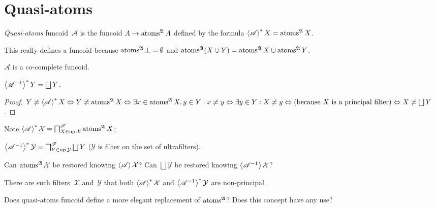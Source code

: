 \chapter{Quasi-atoms}

\begin{defn}
\emph{Quasi-atoms} funcoid~$\mathscr{A}$ is the funcoid $A\rightarrow \operatorname{atoms}^{\mathfrak{A}} A$ defined by the formula
$\left\langle \mathscr{A}\right\rangle ^{\ast} X = \operatorname{atoms}^{\mathfrak{A}} X$.
\end{defn}

This really defines a funcoid because $\operatorname{atoms}^{\mathfrak{A}} \bot = \emptyset$ and
$\operatorname{atoms}^{\mathfrak{A}}(X\cup Y) = \operatorname{atoms}^{\mathfrak{A}}X\cup\operatorname{atoms}^{\mathfrak{A}}Y$.

\begin{obvious}
$\mathscr{A}$ is a co-complete funcoid.
\end{obvious}

\begin{prop}
$\rsupfun{\mathscr{A}^{-1}} Y = \bigsqcup Y$.
\end{prop}

\begin{proof}
$Y \nasymp \left\langle \mathscr{A} \right\rangle^{\ast} X \Leftrightarrow Y
\nasymp \atoms^{\mathfrak{A}} X \Leftrightarrow \exists x \in
\atoms^{\mathfrak{A}} X, y \in Y : x \nasymp y \Leftrightarrow \exists y
\in Y : X \nasymp y \Leftrightarrow \text{(because $X$ is a principal filter)}
\Leftrightarrow X \nasymp \bigsqcup Y$.
\end{proof}

Note
$\left\langle \mathscr{A}\right\rangle ^{\ast} \mathcal{X} =
\bigsqcap^{\mathscr{F}}_{X \in \operatorname{up} \mathcal{X}}
\operatorname{atoms}^{\mathfrak{A}} X$;

$\rsupfun{\mathscr{A}^{-1}} \mathcal{Y} =
\bigsqcap^{\mathscr{F}}_{Y \in \up \mathcal{Y}} \bigsqcup Y$
($\mathcal{Y}$ is filter on the set of ultrafilters).

Can $\operatorname{atoms}^{\mathfrak{A}} \mathcal{X}$ be restored knowing $\left\langle \mathscr{A}\right\rangle \mathcal{X}$?
Can $\bigsqcup \mathcal{Y}$ be restored knowing $\left\langle \mathscr{A}^{-1}\right\rangle \mathcal{X}$?

\begin{conjecture}
There are such filters~$\mathcal{X}$ and~$\mathcal{Y}$ that
both $\left\langle \mathscr{A}\right\rangle ^{\ast} \mathcal{X}$ and $\left\langle \mathscr{A}^{-1}\right\rangle ^{\ast} \mathcal{Y}$
are non-principal.
\end{conjecture}

Does quasi-atoms funcoid define a more elegant replacement of $\operatorname{atoms}^{\mathfrak{A}}$? Does this concept have any use?